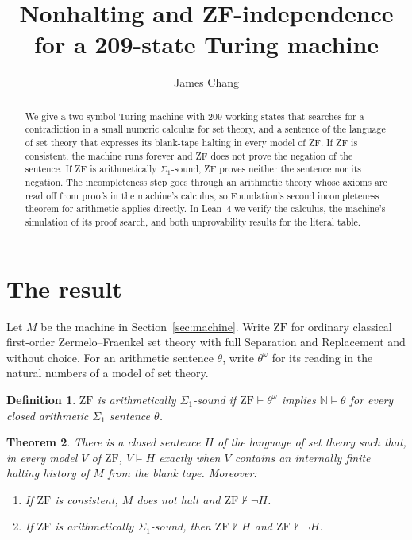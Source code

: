 \documentclass[11pt,letterpaper]{article}
\title{Nonhalting and ZF-independence\\for a 209-state Turing machine}
\author{James Chang}
\date{}
\newtheorem{theorem}{Theorem}[section]
\newtheorem{definition}[theorem]{Definition}
\newcommand{\ZF}{\mathrm{ZF}}
\newcommand{\N}{\mathbb{N}}
\begin{document}
\maketitle

\begin{abstract}
We give a two-symbol Turing machine with 209 working states that
searches for a contradiction in a small numeric calculus for set theory,
and a sentence of the language of set theory that expresses its
blank-tape halting in every model of ZF. If ZF is consistent, the machine
runs forever and ZF does not prove the negation of the sentence. If ZF is
arithmetically $\Sigma_1$-sound, ZF proves neither the sentence nor its
negation. The incompleteness step goes through an arithmetic theory whose
axioms are read off from proofs in the machine's calculus, so Foundation's
second incompleteness theorem for arithmetic applies directly. In Lean~4
we verify the calculus, the machine's simulation of its proof search, and
both unprovability results for the literal table.
\end{abstract}

\section{The result}\label{sec:result}

Let $M$ be the machine in Section~\ref{sec:machine}. Write $\ZF$ for
ordinary classical first-order Zermelo--Fraenkel set theory with full
Separation and Replacement and without choice. For an arithmetic sentence
$\theta$, write $\theta^\omega$ for its reading in the natural numbers of
a model of set theory.

\begin{definition}
$\ZF$ is \emph{arithmetically $\Sigma_1$-sound} if $\ZF\vdash\theta^\omega$
implies $\N\models\theta$ for every closed arithmetic $\Sigma_1$ sentence
$\theta$.
\end{definition}

\begin{theorem}\label{thm:main}
There is a closed sentence $H$ of the language of set theory such that,
in every model $V$ of $\ZF$, $V\models H$ exactly when $V$ contains an
internally finite halting history of $M$ from the blank tape. Moreover:
\begin{enumerate}
\item If $\ZF$ is consistent, $M$ does not halt and $\ZF\nvdash\neg H$.
\item If $\ZF$ is arithmetically $\Sigma_1$-sound, then $\ZF\nvdash H$
  and $\ZF\nvdash\neg H$.
\end{enumerate}
\end{theorem}
\end{document}
